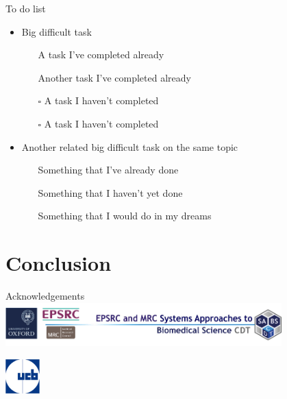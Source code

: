 \documentclass{beamer}
\newcommand{\future}{\faStarO}
\newcommand{\cmark}{\ding{51}}%
\newcommand{\todo}{$\square$}{\raisebox{2pt}}
\newcommand{\done}{\rlap{$\square$}{\raisebox{2pt}{\large\hspace{1pt}\cmark}}%
    \hspace{-2.5pt}}
\begin{document}
\begin{frame}{To do list}
  \centering
  \begin{itemize}
      \setlength\itemsep{1.5em}
    \item Big difficult task 
    \begin{itemize}      \setlength\itemsep{1em}
      \item[\done] A task I've completed already  
      \item[\done] Another task I've completed already
      \item[\todo] A task I haven't completed 
      \item[\todo] A task I haven't completed 
    \end{itemize}
    \item Another related big difficult task on the same topic 
    \begin{itemize}      \setlength\itemsep{1em}
      \item[\done] Something that I've already done  
      \item[\done] Something that I haven't yet done 
      \item[\future] Something that I would do in my dreams 
    \end{itemize}
  \end{itemize}
\end{frame}

\section{Conclusion}

\begin{frame}{Acknowledgements}
\centering
\includegraphics[width=0.8\textwidth]{UpdatedSABSLogo1}

\includegraphics[width=0.1\textwidth]{UCB}\\
\end{frame}
\end{document}
